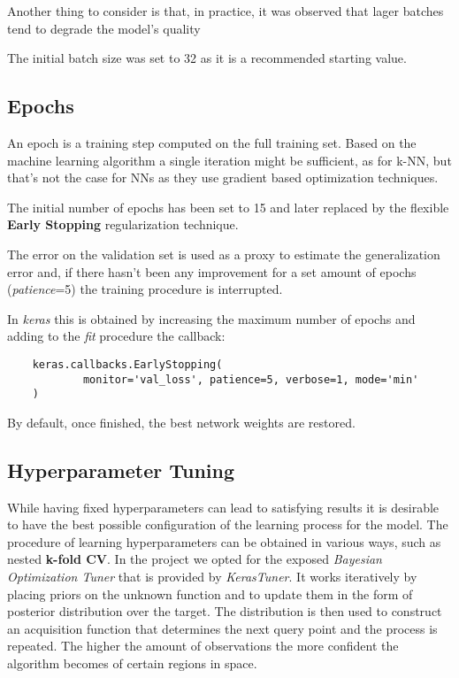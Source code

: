 Another thing to consider is that, in practice, it was observed that lager batches tend to degrade the model's quality\cite{keskar2017largebatch}

The initial batch size was set to 32 as it is a recommended starting value.

\subsection{Epochs}
\label{subsec:epochs}
An epoch is a training step computed on the full training set.
Based on the machine learning algorithm a single iteration might be sufficient, as for k-NN, but that's not the
case for NNs as they use gradient based optimization techniques.

The initial number of epochs has been set to 15 and later replaced by the flexible \textbf{Early Stopping} regularization technique.

The error on the validation set is used as a proxy to estimate the generalization error and, if there hasn't been
any improvement for a set amount of epochs (\textit{patience}=5) the training procedure is interrupted.

In \textit{keras} this is obtained by increasing the maximum number of epochs and adding to the \textit{fit} procedure the callback:
\begin{verbatim}
    keras.callbacks.EarlyStopping(
            monitor='val_loss', patience=5, verbose=1, mode='min'
    )
\end{verbatim}

By default, once finished, the best network weights are restored.

\subsection{Hyperparameter Tuning}\label{subsec:hyperparameter-tuning}
While having fixed hyperparameters can lead to satisfying results it is desirable to have the best possible configuration
of the learning process for the model.
The procedure of learning hyperparameters can be obtained in various ways, such as nested \textbf{k-fold CV}.
In the project we opted for the exposed \textit{Bayesian Optimization Tuner} that is provided by \textit{KerasTuner}.
It works iteratively by placing priors on the unknown function and to update them in the form of posterior distribution over the target.
The distribution is then used to construct an acquisition function that determines the next query point and the process is repeated.
The higher the amount of observations the more confident the algorithm becomes of certain regions in space.\cite{snoek2012practical}

